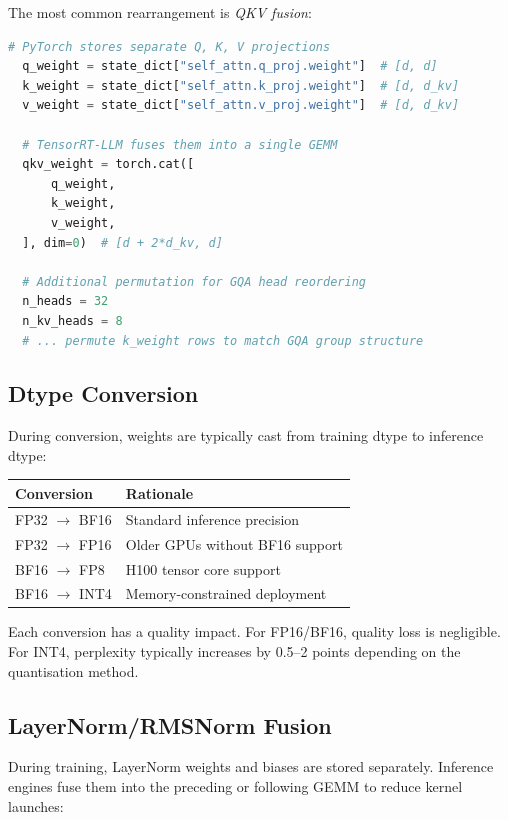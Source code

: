 \documentclass[11pt,a4paper]{article}
\theoremstyle{definition}
\begin{document}
The most common rearrangement is \emph{QKV fusion}:

\begin{lstlisting}[caption=QKV weight fusion for inference, language=Python]
  # PyTorch stores separate Q, K, V projections
  q_weight = state_dict["self_attn.q_proj.weight"]  # [d, d]
  k_weight = state_dict["self_attn.k_proj.weight"]  # [d, d_kv]
  v_weight = state_dict["self_attn.v_proj.weight"]  # [d, d_kv]

  # TensorRT-LLM fuses them into a single GEMM
  qkv_weight = torch.cat([
      q_weight,
      k_weight,
      v_weight,
  ], dim=0)  # [d + 2*d_kv, d]

  # Additional permutation for GQA head reordering
  n_heads = 32
  n_kv_heads = 8
  # ... permute k_weight rows to match GQA group structure
\end{lstlisting}

\subsection{Dtype Conversion}

During conversion, weights are typically cast from training dtype to inference dtype:

\begin{center}
	\begin{tabular}{ll}
		\toprule
		\textbf{Conversion} & \textbf{Rationale}              \\
		\midrule
		FP32 $\to$ BF16     & Standard inference precision    \\
		FP32 $\to$ FP16     & Older GPUs without BF16 support \\
		BF16 $\to$ FP8      & H100 tensor core support        \\
		BF16 $\to$ INT4     & Memory-constrained deployment   \\
		\bottomrule
	\end{tabular}
\end{center}

Each conversion has a quality impact. For FP16/BF16, quality loss is negligible. For INT4, perplexity typically increases by 0.5--2 points depending on the quantisation method.

\subsection{LayerNorm/RMSNorm Fusion}

During training, LayerNorm weights and biases are stored separately. Inference engines fuse them into the preceding or following GEMM to reduce kernel launches:
\end{document}
